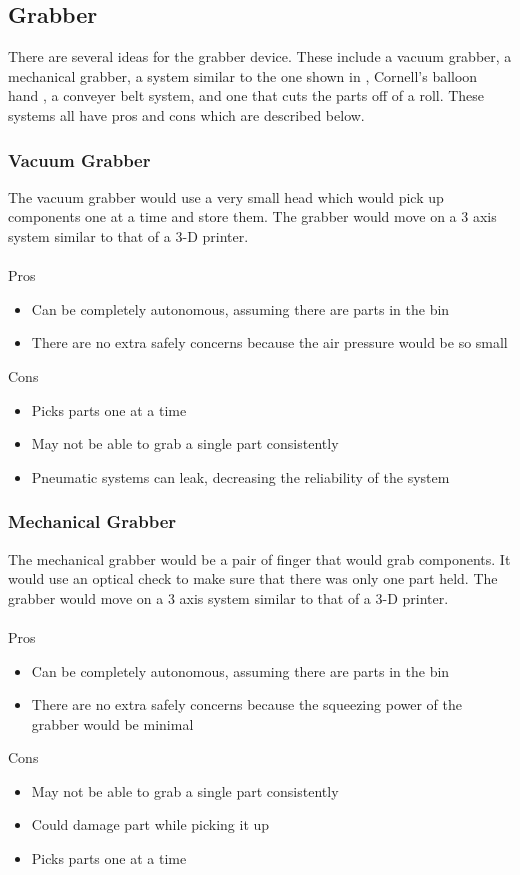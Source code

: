 \documentclass[12pt]{report}
\begin{document}
\subsection*{Grabber}
There are several ideas for the grabber device. These include a vacuum grabber, a mechanical grabber, a system similar to the one shown in \cite{legoSorter}, Cornell's balloon hand \cite{universalGrabber}, a conveyer belt system, and one that cuts the parts off of a roll. These systems all have pros and cons which are described below.

\subsubsection*{Vacuum Grabber}
The vacuum grabber would use a very small head which would pick up components one at a time and store them. The grabber would move on a 3 axis system similar to that of a 3-D printer. \\ \\
Pros
\begin{itemize}
\item Can be completely autonomous, assuming there are parts in the bin
\item There are no extra safely concerns because the air pressure would be so small
\end{itemize}
Cons
\begin{itemize}
\item Picks parts one at a time
\item May not be able to grab a single part consistently
\item Pneumatic systems can leak, decreasing the reliability of the system
\end{itemize}

\subsubsection*{Mechanical Grabber}
The mechanical grabber would be a pair of finger that would grab components. It would use an optical check to make sure that there was only one part held. The grabber would move on a 3 axis system similar to that of a 3-D printer. \\ \\
Pros
\begin{itemize}
\item Can be completely autonomous, assuming there are parts in the bin
\item There are no extra safely concerns because the squeezing power of the grabber would be minimal
\end{itemize}
Cons
\begin{itemize}
\item May not be able to grab a single part consistently
\item Could damage part while picking it up
\item Picks parts one at a time
\end{itemize}
\end{document}
